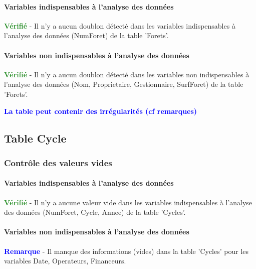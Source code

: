 \documentclass[a4paper]{article}
\begin{document}
\paragraph{Variables indispensables à l'analyse des données}
\textcolor{ForestGreen}{\textbf{Vérifié}} - Il n'y a aucun doublon détecté dans les variables indispensables à l'analyse des données (NumForet) de la table 'Forets'. \\ 

\paragraph{Variables non indispensables à l'analyse des données}
\textcolor{ForestGreen}{\textbf{Vérifié}} - Il n'y a aucun doublon détecté dans les variables non indispensables à l'analyse des données (Nom, Proprietaire, Gestionnaire, SurfForet) de la table 'Forets'. \\ 

\begin{center}
\textcolor{Blue}{\textbf{La table peut contenir des irrégularités (cf remarques)}}
\end{center}


\FloatBarrier

\subsection{Table Cycle}
\subsubsection{Contrôle des valeurs vides}
\paragraph{Variables indispensables à l'analyse des données}
\textcolor{ForestGreen}{\textbf{Vérifié}} - Il n'y a aucune valeur vide dans les variables indispensables à l'analyse des données (NumForet, Cycle, Annee) de la table 'Cycles'. \\ 

\paragraph{Variables non indispensables à l'analyse des données}
\textcolor{blue}{\textbf{Remarque}} - Il manque des informations (vides) dans la table 'Cycles' pour les variables Date, Operateurs, Financeurs. \\ 
\end{document}
